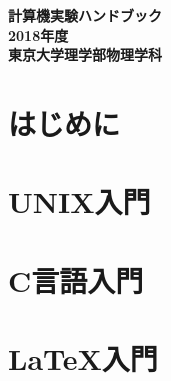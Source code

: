 \documentclass[a4j]{jsbook}
\newcommand{\nendo}{2018}
\begin{document}
\thispagestyle{empty}
\pagestyle{empty}
\begin{titlepage}
\vspace*{5cm}
\begin{center}
{\Huge\bf 計算機実験ハンドブック}\\
\vspace*{14cm}
{\LARGE\bf \nendo 年度}\\
\vspace{1.0cm}
{\LARGE\bf 東京大学理学部物理学科}
\end{center}
\end{titlepage}
\clearpage
\pagestyle{plain}
\cleardoublepage

\setcounter{page}{1}
\tableofcontents
\cleardoublepage

\chapter{はじめに}


\chapter{UNIX入門}


\chapter{C言語入門}


\chapter{\LaTeX 入門}


%


%
\end{document}
